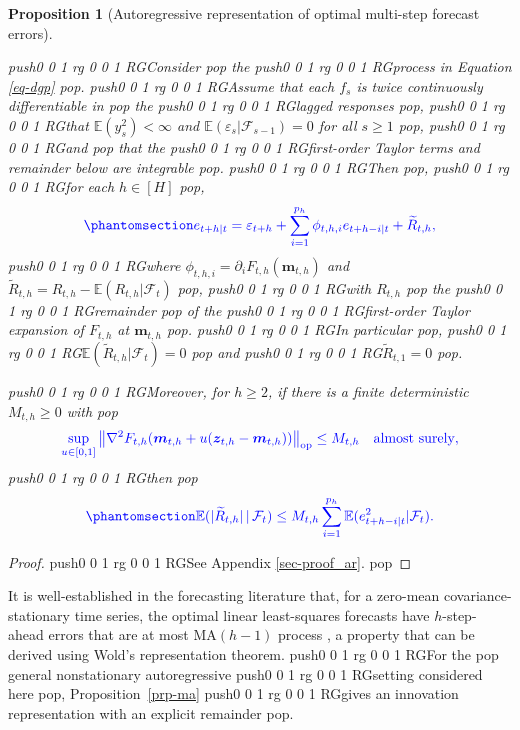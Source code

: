 \documentclass[
  american,
  12pt]{article}
\theoremstyle{plain}
\newtheorem{proposition}{Proposition}[section]
\theoremstyle{plain}
\theoremstyle{remark}
\newcommand{\CPTSadd}[1]{\ifmmode\else\leavevmode\fi\pdfcolorstack 0 push{0 0 1 rg 0 0 1 RG}#1\pdfcolorstack 0 pop}
\begin{document}
\begin{proposition}[Autoregressive representation of optimal multi-step
forecast errors]\protect\hypertarget{prp-ar}{}\label{prp-ar}

\CPTSadd{Consider} the \CPTSadd{process in Equation \eqref{eq-dgp}}. \CPTSadd{Assume that each
\(f_s\) is twice continuously differentiable in} the \CPTSadd{lagged responses},
\CPTSadd{that \(\mathbb E(y_s^2)<\infty\) and
\(\mathbb E(\varepsilon_s|\mathcal F_{s-1})=0\) for all \(s\geq1\)}, \CPTSadd{and}
that the \CPTSadd{first-order Taylor terms and remainder below are integrable}.
\CPTSadd{Then}, \CPTSadd{for each \(h\in[H]\)},
\begin{equation}\CPTSadd{\phantomsection\label{eq-ar}{
e_{t+h|t}
=\varepsilon_{t+h}+\sum_{i=1}^{p_h}\phi_{t,h,i}e_{t+h-i|t}+\widetilde R_{t,h},
}}\end{equation} \CPTSadd{where \(\phi_{t,h,i}=\partial_iF_{t,h}(\bm m_{t,h})\)
and \(\widetilde R_{t,h}=R_{t,h}-\mathbb E(R_{t,h}|\mathcal F_t)\)}, \CPTSadd{with
\(R_{t,h}\)} the \CPTSadd{remainder} of the \CPTSadd{first-order Taylor expansion of
\(F_{t,h}\) at \(\bm m_{t,h}\)}. \CPTSadd{In particular},
\CPTSadd{\(\mathbb E(\widetilde R_{t,h}|\mathcal F_t)=0\)} and
\CPTSadd{\(\widetilde R_{t,1}=0\)}.

\CPTSadd{Moreover, for \(h\geq2\), if there is a finite deterministic
\(M_{t,h}\geq0\) with} \[
\CPTSadd{\sup_{u\in[0,1]}
\left\|\nabla^2F_{t,h}\!\left(\bm m_{t,h}+u(\bm z_{t,h}-\bm m_{t,h})\right)\right\|_{\mathrm{op}}
\leq M_{t,h}\quad\text{almost surely},}
\] \CPTSadd{then} \begin{equation}\CPTSadd{\phantomsection\label{eq-remainder-bound}{
\mathbb E(|\widetilde R_{t,h}|\,|\,\mathcal F_t)
\leq M_{t,h}\sum_{i=1}^{p_h}\mathbb E(e_{t+h-i|t}^2|\mathcal F_t).
}}\end{equation}

\end{proposition}

\begin{proof}
\CPTSadd{See Appendix \ref{sec-proof_ar}.}
\end{proof}

It is well-established in the forecasting literature that, for a
zero-mean covariance-stationary time series, the optimal linear
least-squares forecasts have \(h\)-step-ahead errors that are at most
MA\((h-1)\) process \citep{harvey1997}, a property that can be derived
using Wold's representation theorem. \CPTSadd{For the} general nonstationary
autoregressive \CPTSadd{setting considered here}, Proposition~\ref{prp-ma} \CPTSadd{gives
an innovation representation with an explicit remainder}.
\end{document}
